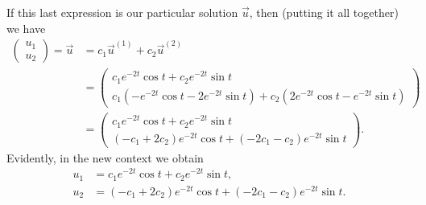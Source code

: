 \documentclass[12pt,twoside]{article}
\begin{document}
If this last expression is our particular solution $\vec{u}$, then (putting it all 
together) we have
\begin{align*}
    \begin{pmatrix}
        u_1 \\ u_2
    \end{pmatrix} = \vec{u} &= c_1 \vec{u}^{(1)} + c_2 \vec{u}^{(2)} \\[2ex]
    &= \begin{pmatrix}
        c_1 e^{-2t} \cos{t} + c_2 e^{-2t} \sin{t} \\
        c_1 (-e^{-2t} \cos{t} - 2e^{-2t} \sin{t}) 
            + c_2 (2 e^{-2t} \cos{t} - e^{-2t} \sin{t}) 
    \end{pmatrix} \\[2ex]
    &= \begin{pmatrix}
        c_1 e^{-2t} \cos{t} + c_2 e^{-2t} \sin{t} \\
        (-c_1 + 2c_2) e^{-2t} \cos{t} + (-2c_1 -c_2) e^{-2t} \sin{t}
    \end{pmatrix}.
\end{align*}
Evidently, in the new context we obtain
\begin{align*}
    u_1 &= c_1 e^{-2t} \cos{t} + c_2 e^{-2t} \sin{t}, \\
    u_2 &= (-c_1 + 2c_2) e^{-2t} \cos{t} + (-2c_1 -c_2) e^{-2t} \sin{t}.
\end{align*}
\end{document}
